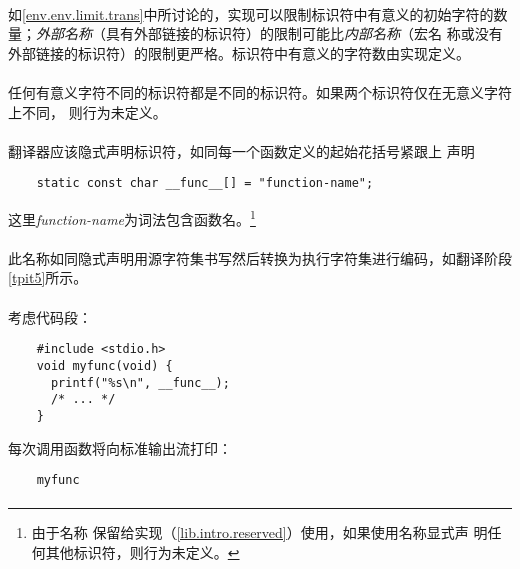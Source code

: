 {\implimit
\paragraph{}
如\ref{env.env.limit.trans}中所讨论的，实现可以限制标识符中有意义的初始字符的数
量；\textit{外部名称}（具有外部链接的标识符）的限制可能比\textit{内部名称}（宏名
称或没有外部链接的标识符）的限制更严格。标识符中有意义的字符数由实现定义。

\paragraph{}
任何有意义字符不同的标识符都是不同的标识符。如果两个标识符仅在无意义字符上不同，
则行为未定义。


\semantic
\paragraph{}
翻译器应该隐式声明标识符，如同每一个函数定义的起始花括号紧跟上
声明
\begin{lstlisting}
    static const char __func__[] = "function-name";
\end{lstlisting}
这里\textit{function-name}为词法包含函数名。\footnote{由于名称
保留给实现（\ref{lib.intro.reserved}）使用，如果使用名称显式声
明任何其他标识符，则行为未定义。}

\paragraph{}
此名称如同隐式声明用源字符集书写然后转换为执行字符集进行编码，如翻译阶段
\ref{tpit5}所示。

\paragraph{}
\ex* 考虑代码段：
\begin{lstlisting}
    #include <stdio.h>
    void myfunc(void) {
      printf("%s\n", __func__);
      /* ... */
    }
\end{lstlisting}
每次调用函数将向标准输出流打印：
\begin{lstlisting}
    myfunc
\end{lstlisting}


\syntax
\paragraph{}

}
